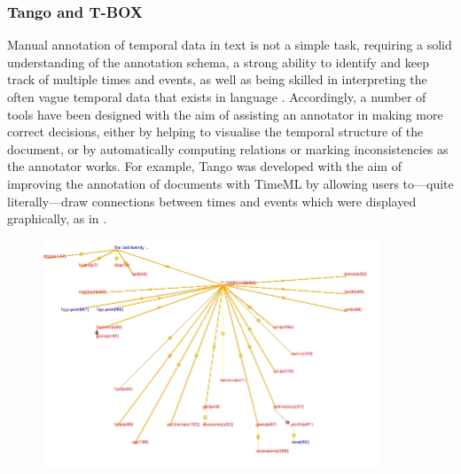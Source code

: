 \documentclass[a4paper,12pt,leqno,twoside]{article}
\begin{document}
\subsubsection{Tango and T-BOX}\label{ssub:tango-tbox}
Manual annotation of temporal data in text is not a simple task, requiring a solid understanding of the annotation schema, a strong ability to identify and keep track of multiple times and events, as well as being skilled in interpreting the often vague temporal data that exists in language \citep[pp. 213--214]{Verhagen2005}. Accordingly, a number of tools have been designed with the aim of assisting an annotator in making more correct decisions, either by helping to visualise the temporal structure of the document, or by automatically computing relations or marking inconsistencies as the annotator works. For example, Tango \citep{pustejovsky2003tango} was developed with the aim of improving the annotation of documents with TimeML by allowing users to---quite literally---draw connections between times and events which were displayed graphically, as in .
\begin{center}
	\begin{figure}[h]
		\centering
		\includegraphics[width=0.9\textwidth]{images/tango}
	\end{figure}
	\label{fig:tango}
\end{center}
\end{document}
